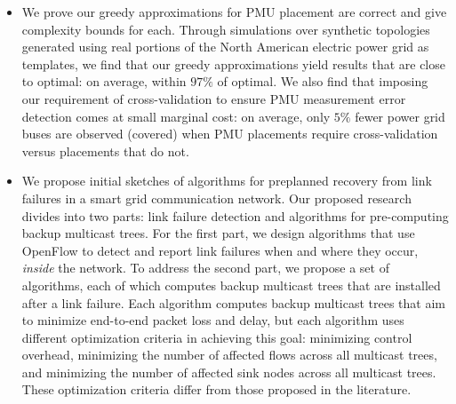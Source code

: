 \begin{itemize}
	\item We prove our greedy approximations for PMU placement are correct and give complexity bounds for each.  Through simulations over synthetic topologies generated using real portions of the 
		North American electric power grid as templates, we find that our greedy approximations yield results that are close to optimal: on average, within $97\%$ of optimal.  We also find that 
		imposing our requirement of cross-validation to ensure PMU measurement error detection comes at small marginal cost: on average, only $5\%$ fewer power grid buses are observed (covered) 
		when PMU placements require cross-validation versus placements that do not. %
	

	\item We propose initial sketches of algorithms for preplanned recovery from link failures in a smart grid communication network.
	Our proposed research divides into two parts: link failure detection and algorithms for pre-computing backup multicast trees.  For the first part, we design algorithms 
	that use OpenFlow to detect and report link failures when and where they occur, \emph{inside} the network.  To address the second part, we 
	propose a set of algorithms, each of which computes backup multicast trees that are installed after a link failure.  Each algorithm computes backup multicast trees that aim to
	minimize end-to-end packet loss and delay, but each algorithm uses different optimization criteria in achieving this goal: minimizing control overhead, 
	minimizing the number of affected flows across all multicast trees, and minimizing the number of affected sink nodes across all multicast trees. 
	These optimization criteria differ from those proposed in the literature.

		
		




\end{itemize}
